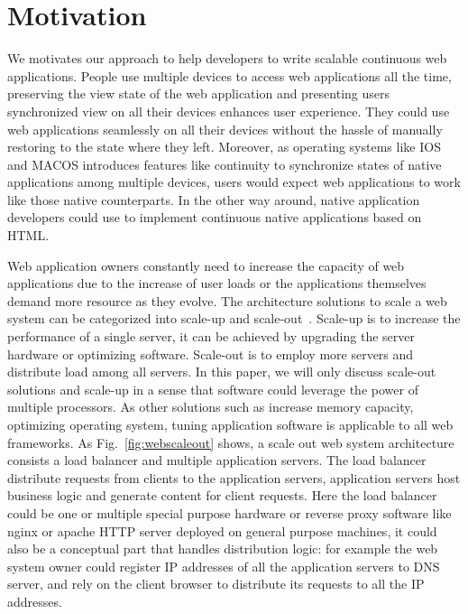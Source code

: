 \section{Motivation}
\label{sec:moti}

We motivates our approach to help developers to write scalable continuous web applications.
People use multiple devices to access web applications all the time, 
preserving the view state of the web application and presenting
users synchronized view on all their devices enhances user experience.
They could use web applications seamlessly on all their devices
without the hassle of manually restoring to the state where they left.
Moreover, as operating systems like IOS and MACOS introduces features
like continuity to synchronize states of native applications among multiple
devices, users would expect web applications to work like those native counterparts.
In the other way around, native application developers could use \cb{} to 
implement continuous native applications based on HTML.

Web application owners constantly need to increase the capacity of web applications due
to the increase of user loads or the applications themselves demand more resource
as they evolve.
The architecture solutions to scale a web system can be categorized into 
scale-up and scale-out~\cite{cardellini2002state}.
Scale-up is to increase the performance of a single server,
it can be achieved by upgrading the server hardware or optimizing software.
Scale-out is to employ more servers and distribute load among all servers.
In this paper, we will only discuss scale-out solutions and scale-up in
a sense that software could leverage the power of multiple processors.
As other solutions such as increase memory capacity, optimizing operating system,
tuning application software is applicable to all web frameworks.
As Fig.~\ref{fig:webscaleout} shows, 
a scale out web system architecture consists a load balancer and multiple
application servers.
The load balancer distribute requests from clients to the application servers,
application servers host business logic and generate content for client requests.
Here the load balancer could be one or multiple special purpose hardware or reverse 
proxy software like nginx or apache HTTP server deployed on general purpose 
machines, it could also be a conceptual part that handles distribution logic:
for example the web system owner could register IP addresses of all the application
servers to DNS server, and rely on the client browser to distribute its requests to
all the IP addresses.


